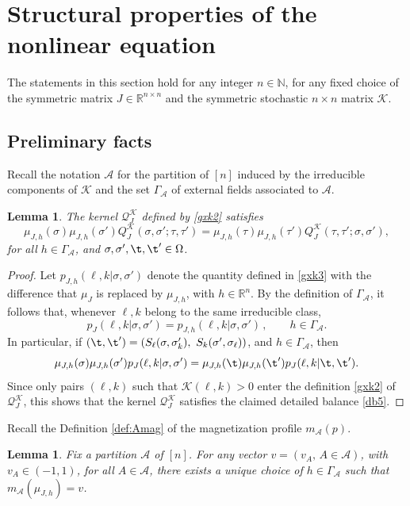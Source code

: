\documentclass[11pt,reqno]{amsart}
\numberwithin{equation}{section}
\numberwithin{figure}{section}
\newtheorem{lemma}[theorem]{Lemma}
\newcommand{\1}{\mathds{1}}
\let\si=\sigma
\let\O=\Omega
\let\G=\Gamma
\newcommand{\cA}{\ensuremath{\mathcal A}}
\newcommand{\cK}{\ensuremath{\mathcal K}}
\newcommand{\cQ}{\ensuremath{\mathcal Q}}
\newcommand{\bbE}{{\ensuremath{\mathbb E}} }
\newcommand{\bbN}{{\ensuremath{\mathbb N}} }
\newcommand{\bbR}{{\ensuremath{\mathbb R}} }
\begin{document}
 

\section{Structural properties of the nonlinear equation}\label{sec:struct}
The statements in this section hold for any integer $n\in\bbN$, for any fixed choice of the symmetric matrix  $J\in\bbR^{n\times  n}$ and the symmetric stochastic $n\times n$ matrix $\cK$.  

\subsection{Preliminary facts}
Recall the notation $\cA$ for the partition of $[n]$ induced by the irreducible components of  $\cK$ and the set $\G_\cA$ of external fields associated to $\cA$. 
\begin{lemma}\label{lem:db}
The kernel $\cQ_J^\cK$ defined by \eqref{gxk2} satisfies 
\begin{equation}\label{db5}
\mu_{J,h}(\sigma) \mu_{J,h}(\sigma')Q_J^{\cK}(\sigma, \sigma'; \tau, \tau') = \mu_{J,h}(\tau) \mu_{J,h}(\tau') Q_J^{\cK}(\tau, \tau'; \sigma, \sigma'),
\end{equation}
for all $h\in \G_\cA$, and $\si,\si',\t,\t'\in\O$.
\end{lemma}
\begin{proof}
Let $p_{J,h}(\ell,k|\si,\si')$ denote the quantity defined in \eqref{gxk3} with the difference that $\mu_J$ is replaced by $\mu_{J,h}$, with $h\in\bbR^n$.  By the definition of $\G_\cA$, it follows that, whenever $\ell,k$ belong to the same irreducible class,  
\[
p_{J}(\ell,k|\si,\si') = p_{J,h}(\ell,k|\si,\si')\,, \qquad h\in\G_\cA.
\]
In particular, if $(\t,\t')=\left(S_\ell(\sigma, \sigma'_k),\ S_k(\sigma', \sigma_\ell)\right)$, and $ h\in\G_\cA$, then 
\[
\mu_{J,h}(\si)\mu_{J,h}(\si')p_{J}(\ell,k|\si,\si') = \mu_{J,h}(\t)\mu_{J,h}(\t')p_{J}(\ell,k|\t,\t').
\]
Since only pairs $(\ell,k)$ such that $\cK(\ell,k)>0$ enter the definition \eqref{gxk2} of $\cQ_J^\cK$,  this shows that the kernel $\cQ_J^{\cK}$ satisfies the claimed detailed balance \eqref{db5}.
\end{proof}
Recall the Definition \ref{def:Amag} of the magnetization profile $m_\cA(p)$.
\begin{lemma}\label{lem:uni}
Fix a partition $\cA$ of $[n]$. For any vector $v = (v_A,\,A\in\cA)$, with $v_A\in(-1,1)$, for all $A\in\cA$, there exists a unique choice of $h\in\G_{\cA}$ such that 
$m_\cA(\mu_{J,h})= v$. 
\end{lemma}
\end{document}
